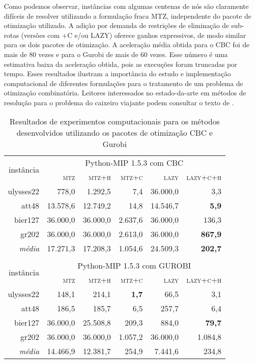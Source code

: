 \documentclass[a4paper,11pt,fleqn]{article}
\begin{document}
Como podemos observar, instâncias com algumas centenas de nós são claramente difíceis de resolver utilizando a formulação fraca MTZ, independente do pacote de otimização utilizado. A adição por demanda de restrições de eliminação de sub-rotas (versões com +C e/ou LAZY) oferece ganhos expressivos, de modo similar para os dois pacotes de otimização. A aceleração média obtida para o CBC foi de mais de 80 vezes e para o Gurobi de mais de 60 vezes. Esse número é uma estimativa baixa da aceleração obtida, pois as execuções foram truncadas por tempo. Esses resultados ilustram a importância do estudo e implementação computacional de diferentes formulações para o tratamento de um problema de otimização combinatória. Leitores interessados no estado-da-arte em métodos de resolução para o problema do caixeiro viajante podem consultar o texto de \cite{Cook2019}.

\begin{table}
	\begin{center}		
    \caption{Resultados de experimentos computacionais para os métodos desenvolvidos utilizando os pacotes de otimização CBC e Gurobi\vspace{10pt}}
    \label{resExp}
\begin{tabular}{|r|r|r|r|r|r|}
\hline 
\multirow{2}{*}{instância} & \multicolumn{5}{c|}{Python-MIP 1.5.3 com CBC}\tabularnewline
\cline{2-6} \cline{3-6} \cline{4-6} \cline{5-6} \cline{6-6} 
 & \textsc{mtz} & \textsc{mtz+h} & \textsc{mtz+c} & \textsc{lazy} & \textsc{lazy+c+h}\tabularnewline
\hline 
\hline 
ulysses22 & 778,0 & 1.292,5 & 7,4 & \cellcolor{gray}36.000,0 & 3,3\tabularnewline
\hline 
att48 & 13.578,6 & 12.749,2 & 14,8 & 14.546,7 & \textbf{5,9}\tabularnewline
\hline 
bier127 & \cellcolor{gray}36.000,0 & \cellcolor{gray}36.000,0 & 2.637,6 & \cellcolor{gray}36.000,0 & 136,3\tabularnewline
\hline 
gr202 & \cellcolor{gray}36.000,0 & \cellcolor{gray}36.000,0 & 2.613,0 & \cellcolor{gray}36.000,0 & \textbf{867,9}\tabularnewline
\hline 
\hline 
\emph{média} & 17.271,3 & 17.208,3 & 1.054,6 & 24.509,3 & \textbf{202,7}\tabularnewline
\hline 
\multicolumn{1}{r}{} & \multicolumn{1}{r}{} & \multicolumn{1}{r}{} & \multicolumn{1}{r}{} & \multicolumn{1}{r}{} & \multicolumn{1}{r}{}\tabularnewline
\hline 
\multirow{2}{*}{instância} & \multicolumn{5}{c|}{Python-MIP 1.5.3 com GUROBI}\tabularnewline
\cline{2-6} \cline{3-6} \cline{4-6} \cline{5-6} \cline{6-6} 
 & \textsc{mtz} & \textsc{mtz+h} & \textsc{mtz+c} & \textsc{lazy} & \textsc{lazy+c+h}\tabularnewline
\hline 
\hline 
ulysses22 & 148,1 & 214,1 & \textbf{1,7} & 66,5 & 3,1\tabularnewline
\hline 
att48 & 186,5 & 185,7 & 6,5 & 257,7 & 6,4\tabularnewline
\hline 
bier127 & \cellcolor{gray}36.000,0 & 25.508,8 & 209,3 & 884,0 & \textbf{79,7}\tabularnewline
\hline 
gr202 & \cellcolor{gray}36.000,0 & \cellcolor{gray}36.000,0 & 1.057,2 & 36.000,0 & 1.084,8\tabularnewline
\hline 
\hline 
\emph{média} & 14.466,9 & 12.381,7 & 254,9 & 7.441,6 & 234,8\tabularnewline
\hline 
\end{tabular}
	\end{center}	
\end{table}
\end{document}
